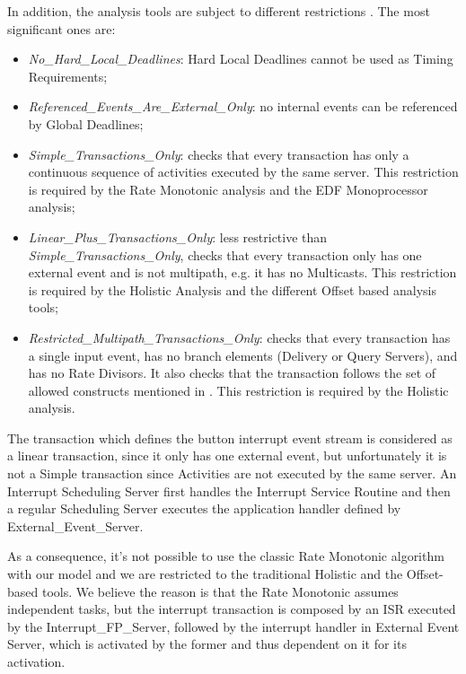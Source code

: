 \documentclass{article}
\begin{document}
In addition, the analysis tools are subject to different restrictions \cite{mast-restrictions}. The most significant ones are:

\begin{itemize}
   \item \textit{No\_Hard\_Local\_Deadlines}: Hard Local Deadlines cannot be used as Timing Requirements;
   \item \textit{Referenced\_Events\_Are\_External\_Only}: no internal events can be referenced by Global Deadlines;
   \item \textit{Simple\_Transactions\_Only}: checks that every transaction has only a continuous sequence of activities executed by the same server. This restriction is required by the Rate Monotonic analysis and the EDF Monoprocessor analysis;
   \item \textit{Linear\_Plus\_Transactions\_Only}: less restrictive than \textit{Simple\_Transactions\_Only}, checks that every transaction only has one external event and is not multipath, e.g. it has no Multicasts. This restriction is required by the Holistic Analysis and the different Offset based analysis tools;
   \item \textit{Restricted\_Multipath\_Transactions\_Only}: checks that every transaction has a single input event, has no branch elements (Delivery or Query Servers), and has no Rate Divisors. It also checks that the transaction follows the set of allowed constructs mentioned in \cite{mast-restrictions}. This restriction is required by the Holistic analysis.
\end{itemize}

The transaction which defines the button interrupt event stream is considered as a linear transaction, since it only has one external event, but unfortunately it is not a Simple transaction since Activities are not executed by the same server. An Interrupt Scheduling Server first handles the Interrupt Service Routine and then a regular Scheduling Server executes the application handler defined by External\_Event\_Server.

As a consequence, it's not possible to use the classic Rate Monotonic algorithm \cite{rm-dm} with our model and we are restricted to the traditional Holistic and the Offset-based tools. We believe the reason is that the Rate Monotonic assumes independent tasks, but the interrupt transaction is composed by an ISR executed by the Interrupt\_FP\_Server, followed by the interrupt handler in External Event Server, which is activated by the former and thus dependent on it for its activation.
\end{document}
